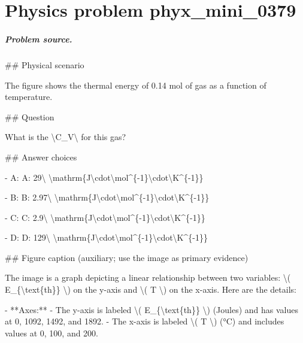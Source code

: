 
\chapter{Physics problem phyx\_mini\_0379}
\label{ch:PhyXMiniProblems_problem_phyx_mini_0379}

\paragraph{Problem source.}
\#\# Physical scenario

The figure shows the thermal energy of 0.14 mol of gas as a function of temperature.

\#\# Question

What is the \textbackslash{}C\_V\textbackslash{} for this gas?

\#\# Answer choices

- A: A: 29\textbackslash{} \textbackslash{}mathrm\{J\textbackslash{}cdot\textbackslash{}mol\textasciicircum{}\{-1\}\textbackslash{}cdot\textbackslash{}K\textasciicircum{}\{-1\}\}

- B: B: 2.97\textbackslash{} \textbackslash{}mathrm\{J\textbackslash{}cdot\textbackslash{}mol\textasciicircum{}\{-1\}\textbackslash{}cdot\textbackslash{}K\textasciicircum{}\{-1\}\}

- C: C: 2.9\textbackslash{} \textbackslash{}mathrm\{J\textbackslash{}cdot\textbackslash{}mol\textasciicircum{}\{-1\}\textbackslash{}cdot\textbackslash{}K\textasciicircum{}\{-1\}\}

- D: D: 129\textbackslash{} \textbackslash{}mathrm\{J\textbackslash{}cdot\textbackslash{}mol\textasciicircum{}\{-1\}\textbackslash{}cdot\textbackslash{}K\textasciicircum{}\{-1\}\}

\#\# Figure caption (auxiliary; use the image as primary evidence)

The image is a graph depicting a linear relationship between two variables: \textbackslash{}( E\_\{\textbackslash{}text\{th\}\} \textbackslash{}) on the y-axis and \textbackslash{}( T \textbackslash{}) on the x-axis. Here are the details:

- **Axes:**
  - The y-axis is labeled \textbackslash{}( E\_\{\textbackslash{}text\{th\}\} \textbackslash{}) (Joules) and has values at 0, 1092, 1492, and 1892.
  - The x-axis is labeled \textbackslash{}( T \textbackslash{}) (°C) and includes values at 0, 100, and 200.

